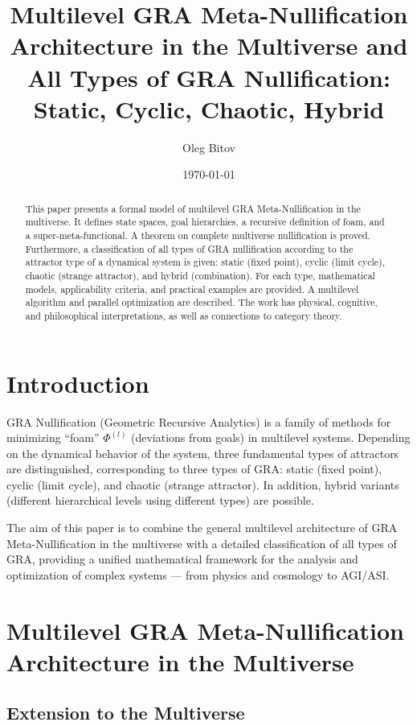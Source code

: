 \documentclass[12pt,a4paper]{article}
\title{Multilevel GRA Meta-Nullification Architecture in the Multiverse and\\ All Types of GRA Nullification: Static, Cyclic, Chaotic, Hybrid}
\author{Oleg Bitov}
\date{\today}
\begin{document}
\maketitle

\begin{abstract}
This paper presents a formal model of multilevel GRA Meta-Nullification in the multiverse. It defines state spaces, goal hierarchies, a recursive definition of foam, and a super-meta-functional. A theorem on complete multiverse nullification is proved. Furthermore, a classification of all types of GRA nullification according to the attractor type of a dynamical system is given: static (fixed point), cyclic (limit cycle), chaotic (strange attractor), and hybrid (combination). For each type, mathematical models, applicability criteria, and practical examples are provided. A multilevel algorithm and parallel optimization are described. The work has physical, cognitive, and philosophical interpretations, as well as connections to category theory.
\end{abstract}

\section{Introduction}

GRA Nullification (Geometric Recursive Analytics) is a family of methods for minimizing “foam” \(\Phi^{(l)}\) (deviations from goals) in multilevel systems. Depending on the dynamical behavior of the system, three fundamental types of attractors are distinguished, corresponding to three types of GRA: static (fixed point), cyclic (limit cycle), and chaotic (strange attractor). In addition, hybrid variants (different hierarchical levels using different types) are possible.

The aim of this paper is to combine the general multilevel architecture of GRA Meta-Nullification in the multiverse with a detailed classification of all types of GRA, providing a unified mathematical framework for the analysis and optimization of complex systems — from physics and cosmology to AGI/ASI.

\section{Multilevel GRA Meta-Nullification Architecture in the Multiverse}

\subsection{Extension to the Multiverse}
\end{document}
